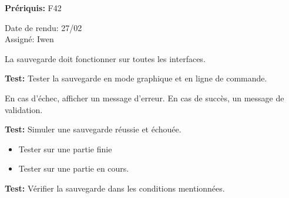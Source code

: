 \documentclass{article}
\begin{document}
\begin{needbox}

    \textbf{Prériquis:} F42
    \begin{duedatebox}
        Date de rendu: 27/02\\
        Assigné: Iwen
    \end{duedatebox}
    \begin{subneedbox}
        La sauvegarde doit fonctionner sur toutes les interfaces.

        \textbf{Test:} Tester la sauvegarde en mode graphique et en ligne de commande.
    \end{subneedbox}
    
    \begin{subneedbox}
        En cas d’échec, afficher un message d’erreur. En cas de succès, un message de validation.

        \textbf{Test:} Simuler une sauvegarde réussie et échouée.
    \end{subneedbox}
    
    \begin{subneedbox}[F35.3: Tests]
        \begin{itemize}
            \item Tester sur une partie finie
            \item Tester sur une partie en cours.
        \end{itemize}

        \textbf{Test:} Vérifier la sauvegarde dans les conditions mentionnées.
    \end{subneedbox}
\end{needbox}
\end{document}
